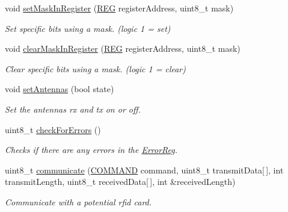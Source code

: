 \begin{DoxyCompactItemize}
void \mbox{\hyperlink{class_m_f_r_c522_ae30686cdd50f6fdb821908a2547e5153}{set\+Mask\+In\+Register}} (\mbox{\hyperlink{class_m_f_r_c522_ae7ec09eb8c9c61288a4770175b4b8db7}{R\+EG}} register\+Address, uint8\+\_\+t mask)
\begin{DoxyCompactList}\small\item\em Set specific bits using a mask. (logic 1 = set) \end{DoxyCompactList}\item 
void \mbox{\hyperlink{class_m_f_r_c522_a9935264b559702a3a4ad2b87735b4f8f}{clear\+Mask\+In\+Register}} (\mbox{\hyperlink{class_m_f_r_c522_ae7ec09eb8c9c61288a4770175b4b8db7}{R\+EG}} register\+Address, uint8\+\_\+t mask)
\begin{DoxyCompactList}\small\item\em Clear specific bits using a mask. (logic 1 = clear) \end{DoxyCompactList}\item 
void \mbox{\hyperlink{class_m_f_r_c522_ad33cc8218440b30747fba97aa59c0583}{set\+Antennas}} (bool state)
\begin{DoxyCompactList}\small\item\em Set the antennas rx and tx on or off. \end{DoxyCompactList}\item 
uint8\+\_\+t \mbox{\hyperlink{class_m_f_r_c522_a6d831a60a08c5f37a264c61f7c79c372}{check\+For\+Errors}} ()
\begin{DoxyCompactList}\small\item\em Checks if there are any errors in the \mbox{\hyperlink{class_m_f_r_c522_ae7ec09eb8c9c61288a4770175b4b8db7a240aa03a1d9542235b89cdef377a5796}{Error\+Reg}}. \end{DoxyCompactList}\item 
uint8\+\_\+t \mbox{\hyperlink{class_m_f_r_c522_ab605cd58a59f1d6cbc48ef0be252e593}{communicate}} (\mbox{\hyperlink{class_m_f_r_c522_abf038692c9cf33ed59b44a612e6ed1c7}{C\+O\+M\+M\+A\+ND}} command, uint8\+\_\+t transmit\+Data\mbox{[}$\,$\mbox{]}, int transmit\+Length, uint8\+\_\+t received\+Data\mbox{[}$\,$\mbox{]}, int \&received\+Length)
\begin{DoxyCompactList}\small\item\em Communicate with a potential rfid card. \end{DoxyCompactList}\end{DoxyCompactItemize}
